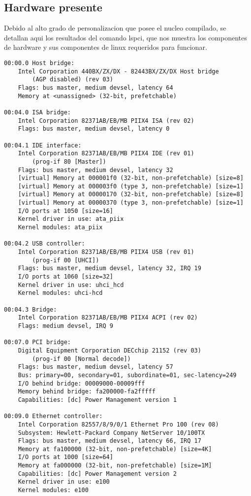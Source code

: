 \documentclass[letterpaper,11pt]{article}
\begin{document}
\subsection{Hardware presente}
Debido al alto grado de personalizacion que posee el nucleo compilado, se
detallan aqui los resultados del comando lspci, que nos muestra los componentes
de hardware y sus componentes de linux requeridos para funcionar.

\small
\begin{verbatim}
00:00.0 Host bridge:
    Intel Corporation 440BX/ZX/DX - 82443BX/ZX/DX Host bridge
        (AGP disabled) (rev 03)
    Flags: bus master, medium devsel, latency 64
    Memory at <unassigned> (32-bit, prefetchable)

00:04.0 ISA bridge:
    Intel Corporation 82371AB/EB/MB PIIX4 ISA (rev 02)
    Flags: bus master, medium devsel, latency 0

00:04.1 IDE interface:
    Intel Corporation 82371AB/EB/MB PIIX4 IDE (rev 01)
        (prog-if 80 [Master])
    Flags: bus master, medium devsel, latency 32
    [virtual] Memory at 000001f0 (32-bit, non-prefetchable) [size=8]
    [virtual] Memory at 000003f0 (type 3, non-prefetchable) [size=1]
    [virtual] Memory at 00000170 (32-bit, non-prefetchable) [size=8]
    [virtual] Memory at 00000370 (type 3, non-prefetchable) [size=1]
    I/O ports at 1050 [size=16]
    Kernel driver in use: ata_piix
    Kernel modules: ata_piix

00:04.2 USB controller:
    Intel Corporation 82371AB/EB/MB PIIX4 USB (rev 01)
        (prog-if 00 [UHCI])
    Flags: bus master, medium devsel, latency 32, IRQ 19
    I/O ports at 1060 [size=32]
    Kernel driver in use: uhci_hcd
    Kernel modules: uhci-hcd

00:04.3 Bridge:
    Intel Corporation 82371AB/EB/MB PIIX4 ACPI (rev 02)
    Flags: medium devsel, IRQ 9

00:07.0 PCI bridge:
    Digital Equipment Corporation DECchip 21152 (rev 03)
        (prog-if 00 [Normal decode])
    Flags: bus master, medium devsel, latency 57
    Bus: primary=00, secondary=01, subordinate=01, sec-latency=249
    I/O behind bridge: 00009000-00009fff
    Memory behind bridge: fa200000-fa2fffff
    Capabilities: [dc] Power Management version 1

00:09.0 Ethernet controller:
    Intel Corporation 82557/8/9/0/1 Ethernet Pro 100 (rev 08)
    Subsystem: Hewlett-Packard Company NetServer 10/100TX
    Flags: bus master, medium devsel, latency 66, IRQ 17
    Memory at fa100000 (32-bit, non-prefetchable) [size=4K]
    I/O ports at 1000 [size=64]
    Memory at fa000000 (32-bit, non-prefetchable) [size=1M]
    Capabilities: [dc] Power Management version 2
    Kernel driver in use: e100
    Kernel modules: e100


\end{verbatim}
\end{document}
